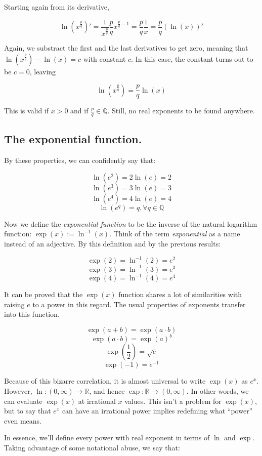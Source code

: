 Starting again from its derivative,

$$\ln(x^{\frac{p}{q}})' = \frac{1}{x^{\frac{p}{q}}} \frac{p}{q} x^{\frac{p}{q} - 1} = \frac{p}{q} \frac{1}{x} = \frac{p}{q} (\ln(x))'$$

Again, we substract the first and the last derivatives to get zero, meaning that $\ln(x^{\frac{p}{q}}) - \ln(x) = c$ with constant $c$. In this case, the constant turns out to be $c = 0$, leaving

$$\ln(x^{\frac{p}{q}}) = \frac{p}{q} \ln(x)$$

This is valid if $x > 0$ and if $\frac{p}{q} \in \mathbb{Q}$. Still, no real exponents to be found anywhere.

\subsection{The exponential function.}

By these properties, we can confidently say that:

$$\ln(e^2) = 2\ln(e) = 2$$
$$\ln(e^3) = 3\ln(e) = 3$$
$$\ln(e^4) = 4\ln(e) = 4$$
$$\ln(e^{q}) = q, \forall q \in \mathbb{Q}$$

Now we define the \textit{exponential function} to be the inverse of the natural logarithm function: $\exp(x) := \ln^{-1}(x)$. Think of the term \textit{exponential} as a name instead of an adjective. By this definition and by the previous results:

$$\exp(2) = \ln^{-1}(2) = e^2$$
$$\exp(3) = \ln^{-1}(3) = e^3$$
$$\exp(4) = \ln^{-1}(4) = e^4$$

It can be proved that the $\exp(x)$ function shares a lot of similarities with raising $e$ to a power in this regard. The usual properties of exponents transfer into this function.

$$\exp(a + b) = \exp(a\cdot b)$$
$$\exp(a \cdot b) = \exp(a)^b$$
$$\exp\left(\frac{1}{2}\right) = \sqrt{e}$$
$$\exp(-1) = e^{-1}$$

Because of this bizarre correlation, it is almost universal to write $\exp(x)$ as $e^x$. However, $\ln: (0, \infty) \to \mathbb{R}$, and hence $\exp: \mathbb{R} \to (0, \infty)$. In other words, we can evaluate $\exp(x)$ at irrational $x$ values. This isn't a problem for $\exp(x)$, but to say that $e^x$ can have an irrational power implies redefining what \enquote{power} even means.

In essence, we'll define every power with real exponent in terms of $\ln$ and $\exp$. Taking advantage of some notational abuse, we say that:


